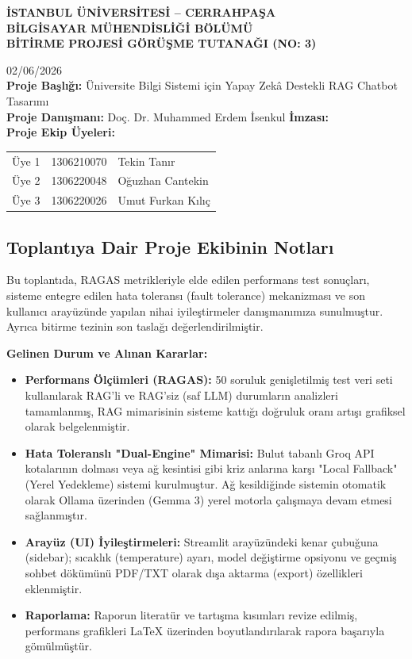 \documentclass[a4paper,12pt]{article}
\begin{document}
\begin{center}

\textbf{\Large İSTANBUL ÜNİVERSİTESİ – CERRAHPAŞA}\\[4pt]
\textbf{\Large BİLGİSAYAR MÜHENDİSLİĞİ BÖLÜMÜ}\\[8pt]
\textbf{\large BİTİRME PROJESİ GÖRÜŞME TUTANAĞI (NO: 3)}
\end{center}
\vspace{1cm}
\hfill 02/06/2026 \\[6pt]
\noindent \textbf{Proje Başlığı:} Üniversite Bilgi Sistemi için Yapay Zekâ Destekli RAG Chatbot Tasarımı \\[6pt]
\textbf{Proje Danışmanı:} Doç. Dr. Muhammed Erdem İsenkul \hfill \textbf{İmzası:} \\[6pt]
\textbf{Proje Ekip Üyeleri:}

\begin{tabular}{p{2cm}p{4cm}p{6cm}}
Üye 1 & 1306210070 & Tekin Tanır \\
Üye 2 & 1306220048 & Oğuzhan Cantekin \\
Üye 3 & 1306220026 & Umut Furkan Kılıç \\
\end{tabular}

\subsection*{Toplantıya Dair Proje Ekibinin Notları}
\noindent Bu toplantıda, RAGAS metrikleriyle elde edilen performans test sonuçları, sisteme entegre edilen hata toleransı (fault tolerance) mekanizması ve son kullanıcı arayüzünde yapılan nihai iyileştirmeler danışmanımıza sunulmuştur. Ayrıca bitirme tezinin son taslağı değerlendirilmiştir.

\textbf{Gelinen Durum ve Alınan Kararlar:}
\begin{itemize}
    \item \textbf{Performans Ölçümleri (RAGAS):} 50 soruluk genişletilmiş test veri seti kullanılarak RAG'li ve RAG'siz (saf LLM) durumların analizleri tamamlanmış, RAG mimarisinin sisteme kattığı doğruluk oranı artışı grafiksel olarak belgelenmiştir.
    \item \textbf{Hata Toleranslı "Dual-Engine" Mimarisi:} Bulut tabanlı Groq API kotalarının dolması veya ağ kesintisi gibi kriz anlarına karşı "Local Fallback" (Yerel Yedekleme) sistemi kurulmuştur. Ağ kesildiğinde sistemin otomatik olarak Ollama üzerinden (Gemma 3) yerel motorla çalışmaya devam etmesi sağlanmıştır.
    \item \textbf{Arayüz (UI) İyileştirmeleri:} Streamlit arayüzündeki kenar çubuğuna (sidebar); sıcaklık (temperature) ayarı, model değiştirme opsiyonu ve geçmiş sohbet dökümünü PDF/TXT olarak dışa aktarma (export) özellikleri eklenmiştir.
    \item \textbf{Raporlama:} Raporun literatür ve tartışma kısımları revize edilmiş, performans grafikleri LaTeX üzerinden boyutlandırılarak rapora başarıyla gömülmüştür.
\end{itemize}
\end{document}
